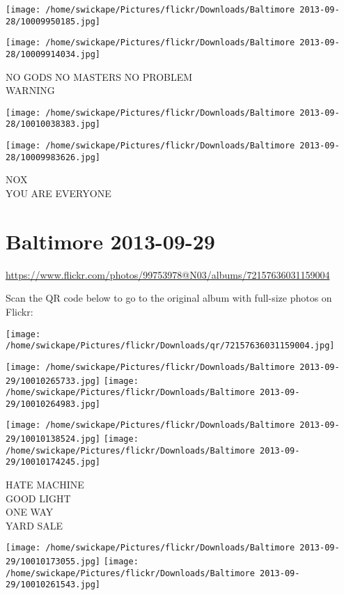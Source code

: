 \documentclass[10pt,letterpaper]{article}
\begin{document}
\texttt{[image: /home/swickape/Pictures/flickr/Downloads/Baltimore 2013-09-28/10009950185.jpg]}

\vspace{0.25in}
\texttt{[image: /home/swickape/Pictures/flickr/Downloads/Baltimore 2013-09-28/10009914034.jpg]}

NO GODS NO MASTERS NO PROBLEM\\
WARNING
\pagebreak

\texttt{[image: /home/swickape/Pictures/flickr/Downloads/Baltimore 2013-09-28/10010038383.jpg]}

\vspace{0.25in}
\texttt{[image: /home/swickape/Pictures/flickr/Downloads/Baltimore 2013-09-28/10009983626.jpg]}

NOX\\
YOU ARE EVERYONE
\pagebreak

\section*{Baltimore 2013-09-29}

\url{https://www.flickr.com/photos/99753978@N03/albums/72157636031159004}

Scan the QR code below to go to the original album with full-size photos on Flickr:

\texttt{[image: /home/swickape/Pictures/flickr/Downloads/qr/72157636031159004.jpg]}
\pagebreak

\texttt{[image: /home/swickape/Pictures/flickr/Downloads/Baltimore 2013-09-29/10010265733.jpg]}
\texttt{[image: /home/swickape/Pictures/flickr/Downloads/Baltimore 2013-09-29/10010264983.jpg]}

\texttt{[image: /home/swickape/Pictures/flickr/Downloads/Baltimore 2013-09-29/10010138524.jpg]}
\texttt{[image: /home/swickape/Pictures/flickr/Downloads/Baltimore 2013-09-29/10010174245.jpg]}

HATE MACHINE\\
GOOD LIGHT\\
ONE WAY\\
YARD SALE
\pagebreak

\texttt{[image: /home/swickape/Pictures/flickr/Downloads/Baltimore 2013-09-29/10010173055.jpg]}
\texttt{[image: /home/swickape/Pictures/flickr/Downloads/Baltimore 2013-09-29/10010261543.jpg]}
\end{document}
